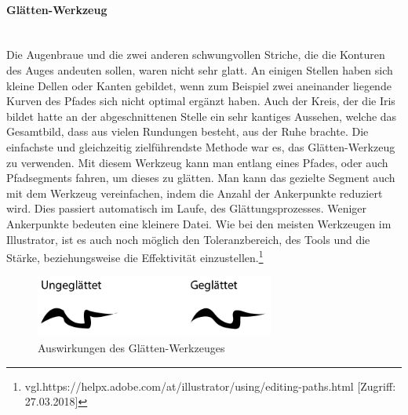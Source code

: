 \paragraph{Glätten-Werkzeug}
\leavevmode \\
Die Augenbraue und die zwei anderen schwungvollen Striche, die die Konturen des Auges andeuten sollen, waren nicht sehr glatt. An einigen Stellen haben sich kleine Dellen oder Kanten gebildet, wenn zum Beispiel zwei aneinander liegende Kurven des Pfades sich nicht optimal ergänzt haben. Auch der Kreis, der die Iris bildet hatte an der abgeschnittenen Stelle ein sehr kantiges Aussehen, welche das Gesamtbild, dass aus vielen Rundungen besteht, aus der Ruhe brachte. Die einfachste und gleichzeitig zielführendste Methode war es, das Glätten-Werkzeug zu verwenden. Mit diesem Werkzeug kann man entlang eines Pfades, oder auch Pfadsegments fahren, um dieses zu glätten. Man kann das gezielte Segment auch mit dem Werkzeug vereinfachen, indem die Anzahl der Ankerpunkte reduziert wird. Dies passiert automatisch im Laufe, des Glättungsprozesses. Weniger Ankerpunkte bedeuten eine kleinere Datei. Wie bei den meisten Werkzeugen im Illustrator, ist es auch noch möglich den Toleranzbereich, des Tools und die Stärke, beziehungsweise die Effektivität einzustellen.\footnote{\label{} vgl.https://helpx.adobe.com/at/illustrator/using/editing-paths.html  [Zugriff: 27.03.2018]}

\begin{figure}[H] 
  \centering
     \includegraphics[width=0.7\textwidth]{design_abb3.png}
  \caption{Auswirkungen des Glätten-Werkzeuges}
\end{figure}

